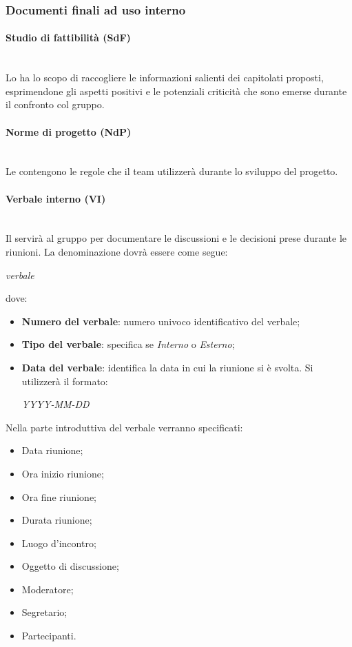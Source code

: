 	\subsubsection{Documenti finali ad uso interno}
		\paragraph{Studio di fattibilità (SdF)}
		~\\Lo \SdF{} ha lo scopo di raccogliere le informazioni salienti dei capitolati proposti, esprimendone gli aspetti positivi e 
		le potenziali criticità che sono emerse durante il confronto col gruppo.
		\paragraph{Norme di progetto (NdP)}
		~\\Le \NdP{} contengono le regole che il team utilizzerà durante lo sviluppo del progetto.
		\paragraph{Verbale interno (VI)}
		~\\Il \VI{} servirà al gruppo per documentare le discussioni e le decisioni prese durante le riunioni. 
		La denominazione dovrà essere come segue:\\
		\begin{center}
			\textit{verbale} 
		\end{center}
		dove:
		\begin{itemize}
			\item \textbf{Numero del verbale}:
			numero univoco identificativo del verbale;
			\item \textbf{Tipo del verbale}:
			specifica se \emph{Interno} o \emph{Esterno};
			\item \textbf{Data del verbale}:
			identifica la data in cui la riunione si è svolta. Si utilizzerà il formato:
			\begin{center}
				\emph{YYYY-MM-DD}
			\end{center}
		\end{itemize}
		Nella parte introduttiva del verbale verranno specificati:
		\begin{itemize}
			\item Data riunione;
			\item Ora inizio riunione;
			\item Ora fine riunione;
			\item Durata riunione;
			\item Luogo d'incontro;
			\item Oggetto di discussione;
			\item Moderatore;
			\item Segretario;
			\item Partecipanti.
		\end{itemize}

